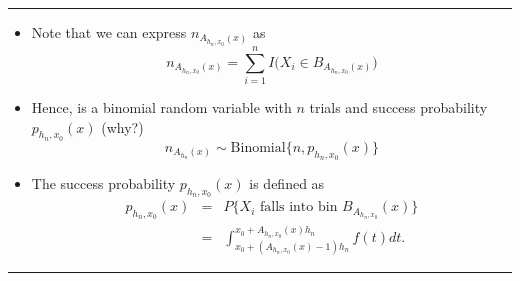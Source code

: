 \documentclass[]{book}
\begin{document}
\begin{center}\rule{0.5\linewidth}{\linethickness}\end{center}

\begin{itemize}
\item
  Note that we can express \(n_{A_{h_{n}, x_{0}}(x)}\) as
  \begin{equation}
  n_{A_{h_{n}, x_{0}}(x)} = \sum_{i = 1}^{n} I\Big( X_{i} \in B_{A_{h_{n}, x_{0}}(x)} \Big) \nonumber
  \end{equation}
\item
  Hence, is a binomial random variable with \(n\) trials
  and success probability \(p_{h_{n}, x_{0}}(x)\) (why?)
  \begin{equation}
  n_{A_{h_{n}}(x)} \sim \textrm{Binomial}\{ n, p_{h_{n}, x_{0}}(x) \} \nonumber
  \end{equation}
\item
  The success probability \(p_{h_{n}, x_{0}}(x)\) is defined as
  \begin{eqnarray}
  p_{h_{n}, x_{0}}(x) &=& P\Big\{ X_{i} \textrm{ falls into bin } B_{A_{h_{n}, x_{0}}}(x) \Big\}   \nonumber \\
  &=& \int_{x_{0} + (A_{h_{n}, x_{0}}(x) - 1)h_{n}}^{x_{0} + A_{h_{n}, x_{0}}(x)h_{n} } f(t) dt.
  \end{eqnarray}
\end{itemize}

\begin{center}\rule{0.5\linewidth}{\linethickness}\end{center}
\end{document}
